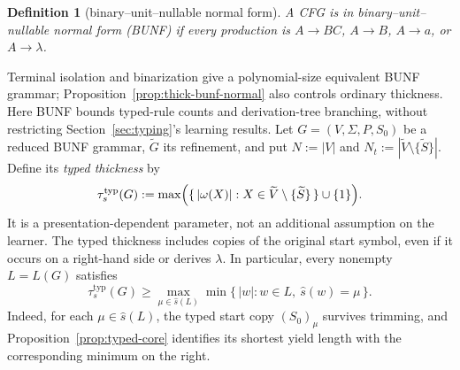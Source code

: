 \documentclass[11pt,a4paper]{article}
\newtheorem{definition}[theorem]{Definition}
\theoremstyle{remark}
\theoremstyle{plain}
\begin{document}
\begin{definition}[binary--unit--nullable normal form]
A CFG is in \emph{binary--unit--nullable normal form} (BUNF)
if every production is $A\to BC$, $A\to B$,
$A\to a$, or $A\to\lambda$.
\end{definition}
Terminal isolation and binarization give a polynomial-size
equivalent BUNF grammar; Proposition~\ref{prop:thick-bunf-normal}
also controls ordinary thickness.  Here BUNF bounds
typed-rule counts and derivation-tree branching,
without restricting Section~\ref{sec:typing}'s learning results.
Let $G=(V,\Sigma,P,S_0)$ be a reduced BUNF grammar,
$\widetilde G$ its refinement, and put
$N:=|V|$ and
$N_t:=|\widetilde V\setminus\{\widetilde S\}|$.
Define its \emph{typed thickness} by
\[
\tau_s^{\mathrm{typ}}(G):=
\max\Bigl(\{\,|\omega(X)|:
X\in\widetilde V\setminus\{\widetilde S\}\,\}\cup\{1\}\Bigr).
\]
It is a presentation-dependent parameter, not an
additional assumption on the learner.
The typed thickness includes copies of the original start symbol,
even if it occurs on a right-hand side or derives $\lambda$.
In particular, every nonempty $L=L(G)$ satisfies
\begin{equation}\tag{$\spadesuit$}\label{eq:typed-fiber-min}
 \tau_s^{\mathrm{typ}}(G)\ge
 \max_{\mu\in\widehat s(L)}
 \min\{\,|w|:w\in L,\ \widehat s(w)=\mu\,\}.
\end{equation}
Indeed, for each $\mu\in\widehat s(L)$, the typed start copy
$(S_0)_\mu$ survives trimming, and
Proposition~\ref{prop:typed-core} identifies its shortest yield length
with the corresponding minimum on the right.
\end{document}
